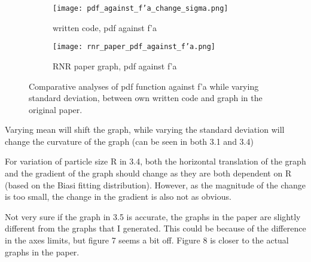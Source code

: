 \documentclass{article}
\begin{document}
\begin{figure}[H]
    \centering
    \begin{subfigure}{0.48\linewidth}
        \texttt{[image: pdf\_against\_f'a\_change\_sigma.png]}
        \caption{written code, pdf against f'a}
    \end{subfigure}
    \hfill
    \begin{subfigure}{0.48\linewidth}
        \texttt{[image: rnr\_paper\_pdf\_against\_f'a.png]}
        \caption{RNR paper graph, pdf against f'a}
    \end{subfigure}
    \caption{Comparative analyses of pdf function against f'a while varying standard deviation, between own written code and graph in the original paper.}
\end{figure}

Varying mean will shift the graph, while varying the standard deviation will change the curvature of the graph (can be seen in both 3.1 and 3.4) \par
For variation of particle size R in 3.4, both the horizontal translation of the graph and the gradient of the graph should change as they are both dependent on R (based on the Biasi fitting distribution). However, as the magnitude of the change is too small, the change in the gradient is also not as obvious. \par
Not very sure if the graph in 3.5 is accurate, the graphs in the paper are slightly different from the graphs that I generated. This could be because of the difference in the axes limits, but figure 7 seems a bit off. Figure 8 is closer to the actual graphs in the paper. 
\end{document}
